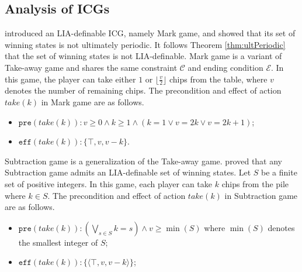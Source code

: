 \documentclass[review]{elsarticle}
\newcommand{\set}[1]{\{ #1 \}}
\newcommand{\tuple}[1]{\langle {#1} \rangle}
\newcommand{\true}{\top}
\newcommand{\constraint}{\mathcal{C}}
\newcommand{\estate}{\mathcal{E}}
\newcommand{\pre}{\mathtt{pre}}
\newcommand{\eff}{\mathtt{eff}}
\newtheorem{theorem}{Theorem}
\begin{document}
\subsection{Analysis of ICGs}
\citet{Fra2011} introduced an LIA-definable ICG, namely Mark game, and showed that its set of winning states is not ultimately periodic.
It follows Theorem \ref{thm:ultPeriodic} that the set of winning states is not LIA-definable.
Mark game is a variant of Take-away game and shares the same constraint $\constraint$ and ending condition $\estate$.
In this game, the player can take either $1$ or $\lfloor \frac{v}{2} \rfloor$ chips from the table, where $v$ denotes the number of remaining chips.
The precondition and effect of action $take(k)$ in Mark game are as follows.
\begin{itemize}
	\item $\pre(take(k)) :  v \ge 0 \land k \ge 1 \land (k = 1 \lor v = 2k \lor v = 2k + 1)$;
	\item $\eff(take(k)) : \set{\true, v, v - k}$.
\end{itemize}





Subtraction game \cite{Yag2001} is a generalization of the Take-away game.
\citet{BerCG2001} proved that any Subtraction game admits an LIA-definable set of winning states.
Let $S$ be a finite set of positive integers.
In this game, each player can take $k$ chips from the pile where $ k \in S$.
The precondition and effect of action $take(k)$ in Subtraction game are as follows.
\begin{itemize}
	\item $\pre(take(k)) : (\bigvee_{s \in S} k = s) \land v \geq \min(S)$ where $\min(S)$ denotes the smallest integer of $S$;
	\item $\eff(take(k)) : \set{\tuple{\true, v, v - k}}$;
\end{itemize}
\end{document}
